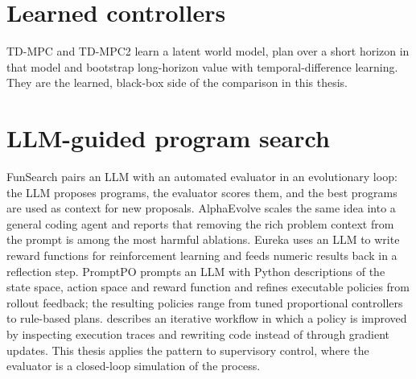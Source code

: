 \section{Learned controllers}
\label{sec:bg-learned}
TD-MPC \cite{hansen2022tdmpc} and TD-MPC2 \cite{hansen2024tdmpc2} learn a
latent world model, plan over a short horizon in that model and bootstrap
long-horizon value with temporal-difference learning. They are the learned,
black-box side of the comparison in this thesis.

\section{LLM-guided program search}
\label{sec:bg-program-search}
FunSearch \cite{romeraparedes2024funsearch} pairs an LLM with an automated
evaluator in an evolutionary loop: the LLM proposes programs, the evaluator
scores them, and the best programs are used as context for new proposals.
AlphaEvolve \cite{novikov2025alphaevolve} scales the same idea into a general
coding agent and reports that removing the rich problem context from the
prompt is among the most harmful ablations. Eureka \cite{ma2024eureka} uses an
LLM to write reward functions for reinforcement learning and feeds numeric
results back in a reflection step. PromptPO \cite{hatgiskessell2026promptpo}
prompts an LLM with Python descriptions of the state space, action space and
reward function and refines executable policies from rollout feedback; the
resulting policies range from tuned proportional controllers to rule-based
plans. \textcite{weng2026lbg} describes an
iterative workflow in which a policy is improved by inspecting execution
traces and rewriting code instead of through gradient updates. This thesis applies the
pattern to supervisory control, where the evaluator is a closed-loop
simulation of the process.

